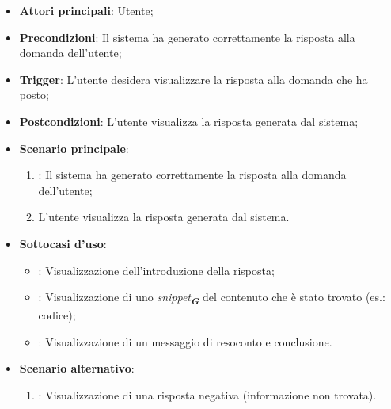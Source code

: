 \begin{itemize}
    \item \textbf{Attori principali}: Utente;
    \item \textbf{Precondizioni}: Il sistema ha generato correttamente la risposta alla domanda dell'utente;
    \item \textbf{Trigger}: L'utente desidera visualizzare la risposta alla domanda che ha posto;
    \item \textbf{Postcondizioni}: L'utente visualizza la risposta generata dal sistema;
    \item \textbf{Scenario principale}:
    \begin{enumerate}
        \item {}: Il sistema ha generato correttamente la risposta alla domanda dell'utente;
        \item L'utente visualizza la risposta generata dal sistema.
    \end{enumerate}
    \item \textbf{Sottocasi d'uso}:
    \begin{itemize}
        \item {}: Visualizzazione dell'introduzione della risposta;
        \item {}: Visualizzazione di uno \emph{snippet}\textsubscript{\textbf{\textit{G}}} del contenuto che è stato trovato (es.: codice);
        \item {}: Visualizzazione di un messaggio di resoconto e conclusione.
    \end{itemize}
    \item \textbf{Scenario alternativo}:
    \begin{enumerate}
        \item {}: Visualizzazione di una risposta negativa (informazione non trovata).
    \end{enumerate}
\end{itemize}



\hypertarget{UC5.1}{}

